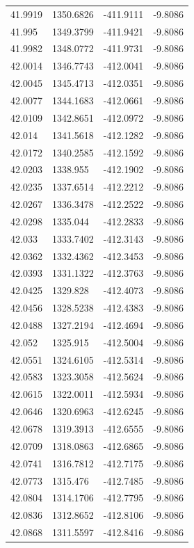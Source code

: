 \begin{table}[H]
\begin{tabular}{llll}
41.9919 & 1350.6826 & -411.9111 & -9.8086 \\
41.995 & 1349.3799 & -411.9421 & -9.8086 \\
41.9982 & 1348.0772 & -411.9731 & -9.8086 \\
42.0014 & 1346.7743 & -412.0041 & -9.8086 \\
42.0045 & 1345.4713 & -412.0351 & -9.8086 \\
42.0077 & 1344.1683 & -412.0661 & -9.8086 \\
42.0109 & 1342.8651 & -412.0972 & -9.8086 \\
42.014 & 1341.5618 & -412.1282 & -9.8086 \\
42.0172 & 1340.2585 & -412.1592 & -9.8086 \\
42.0203 & 1338.955 & -412.1902 & -9.8086 \\
42.0235 & 1337.6514 & -412.2212 & -9.8086 \\
42.0267 & 1336.3478 & -412.2522 & -9.8086 \\
42.0298 & 1335.044 & -412.2833 & -9.8086 \\
42.033 & 1333.7402 & -412.3143 & -9.8086 \\
42.0362 & 1332.4362 & -412.3453 & -9.8086 \\
42.0393 & 1331.1322 & -412.3763 & -9.8086 \\
42.0425 & 1329.828 & -412.4073 & -9.8086 \\
42.0456 & 1328.5238 & -412.4383 & -9.8086 \\
42.0488 & 1327.2194 & -412.4694 & -9.8086 \\
42.052 & 1325.915 & -412.5004 & -9.8086 \\
42.0551 & 1324.6105 & -412.5314 & -9.8086 \\
42.0583 & 1323.3058 & -412.5624 & -9.8086 \\
42.0615 & 1322.0011 & -412.5934 & -9.8086 \\
42.0646 & 1320.6963 & -412.6245 & -9.8086 \\
42.0678 & 1319.3913 & -412.6555 & -9.8086 \\
42.0709 & 1318.0863 & -412.6865 & -9.8086 \\
42.0741 & 1316.7812 & -412.7175 & -9.8086 \\
42.0773 & 1315.476 & -412.7485 & -9.8086 \\
42.0804 & 1314.1706 & -412.7795 & -9.8086 \\
42.0836 & 1312.8652 & -412.8106 & -9.8086 \\
42.0868 & 1311.5597 & -412.8416 & -9.8086 \\

\end{tabular}
\end{table}

